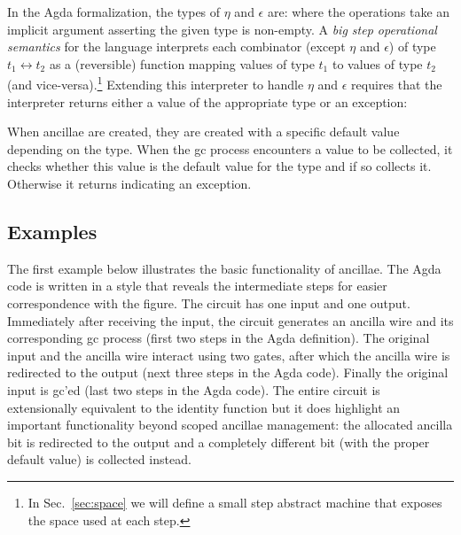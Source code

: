 \documentclass[sigplan,10pt,review,anonymous]{acmart}
\begin{document}
In the Agda formalization, the types of $\eta$ and $\epsilon$ are:
\EtaEpsilon{}
\noindent where the operations take an implicit argument asserting the
given type is non-empty. A \emph{big step operational semantics} for
the language interprets each combinator (except $\eta$ and $\epsilon$)
of type $t_1 \leftrightarrow t_2$ as a (reversible) function mapping
values of type $t_1$ to values of type $t_2$ (and
vice-versa).\footnote{In Sec.~\ref{sec:space} we will define a small
  step abstract machine that exposes the space used at each step.}
Extending this interpreter to handle $\eta$ and $\epsilon$ requires
that the interpreter returns either a value of the appropriate type or an
exception:

\dyninterp{}

When ancillae are created, they are created with a specific default
value depending on the type. When the gc process encounters a value to
be collected, it checks whether this value is the default value for
the type and if so collects it. Otherwise it returns
 indicating an exception.

\subsection{Examples}
\label{sub:id}

The first example below illustrates the basic functionality of
ancillae. The Agda code is written in a style that reveals the
intermediate steps for easier correspondence with the figure. The
circuit has one input and one output. Immediately after receiving the
input, the circuit generates an ancilla wire and its corresponding gc
process (first two steps in the Agda definition). The original input
and the ancilla wire interact using two  gates,
after which the ancilla wire is redirected to the output (next three
steps in the Agda code). Finally the original input is gc'ed (last two
steps in the Agda code). The entire circuit is extensionally
equivalent to the identity function but it does highlight an important
functionality beyond scoped ancillae management: the allocated ancilla
bit is redirected to the output and a completely different bit (with
the proper default value) is collected instead.

\medskip
\begin{center}

\end{center}

\EtaEpsilonExampleone{}
\end{document}
